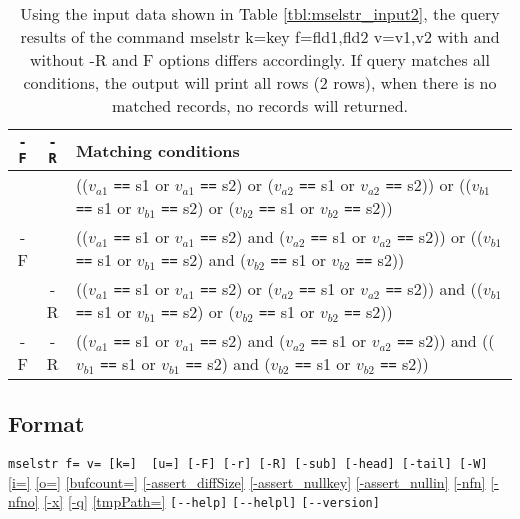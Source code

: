 \begin{table}[htbp]
\begin{center}
\caption{Using the input data shown in Table \ref{tbl:mselstr_input2}, the query results of the command 
mselstr k=key f=fld1,fld2 v=v1,v2 with and without -R and F options differs accordingly.  
If query matches all conditions, the output will print all rows (2 rows), when there is no matched records, no records will returned. \label{tbl:mselstr_cond}}

{\footnotesize
\begin{tabular}{ccl}
\hline
\verb|-F| & \verb|-R| & Matching conditions  \\
\hline
   &    &
(($v_{a1}$ \verb|==| s1 or $v_{a1}$ \verb|==| s2)  or
 ($v_{a2}$ \verb|==| s1 or $v_{a2}$ \verb|==| s2)) or
(($v_{b1}$ \verb|==| s1 or $v_{b1}$ \verb|==| s2)  or
 ($v_{b2}$ \verb|==| s1 or $v_{b2}$ \verb|==| s2)) \\
-F &    &
(($v_{a1}$ \verb|==| s1 or $v_{a1}$ \verb|==| s2)  and
 ($v_{a2}$ \verb|==| s1 or $v_{a2}$ \verb|==| s2)) or
(($v_{b1}$ \verb|==| s1 or $v_{b1}$ \verb|==| s2)  and
 ($v_{b2}$ \verb|==| s1 or $v_{b2}$ \verb|==| s2)) \\
   & -R & 
(($v_{a1}$ \verb|==| s1 or $v_{a1}$ \verb|==| s2)  or
 ($v_{a2}$ \verb|==| s1 or $v_{a2}$ \verb|==| s2)) and
(($v_{b1}$ \verb|==| s1 or $v_{b1}$ \verb|==| s2)  or
 ($v_{b2}$ \verb|==| s1 or $v_{b2}$ \verb|==| s2)) \\
-F & -R & 
(($v_{a1}$ \verb|==| s1 or $v_{a1}$ \verb|==| s2)  and
 ($v_{a2}$ \verb|==| s1 or $v_{a2}$ \verb|==| s2)) and
(($v_{b1}$ \verb|==| s1 or $v_{b1}$ \verb|==| s2)  and
 ($v_{b2}$ \verb|==| s1 or $v_{b2}$ \verb|==| s2)) \\
\hline
\end{tabular}
}

\end{center}
\end{table}

\subsection*{Format}
\verb|mselstr f= v= [k=]  [u=] [-F] [-r] [-R] [-sub] [-head] [-tail] [-W]|
\hyperref[sect:option_i]{[i=]}
\hyperref[sect:option_o]{[o=]}
\hyperref[sect:option_bufcount]{[bufcount=]} 
\hyperref[sect:option_assert_diffSize]{[-assert\_diffSize]}
\hyperref[sect:option_assert_nullkey]{[-assert\_nullkey]}
\hyperref[sect:option_assert_nullin]{[-assert\_nullin]}
\hyperref[sect:option_nfn]{[-nfn]} 
\hyperref[sect:option_nfno]{[-nfno]}  
\hyperref[sect:option_x]{[-x]}
\hyperref[sect:option_q]{[-q]}
\hyperref[sect:option_option_tmppath]{[tmpPath=]}
\verb|[--help]|
\verb|[--helpl]|
\verb|[--version]|\\


